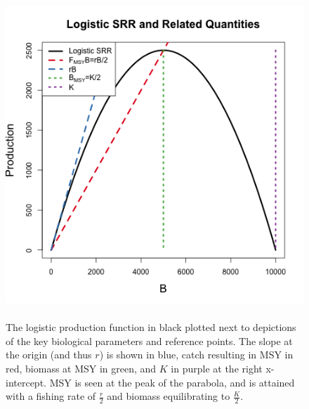 \begin{figure}[h!]
\begin{minipage}[h!]{0.6\textwidth}
        \includegraphics[width=\textwidth]{./plots/srrSchaeffer.png}
\end{minipage}
\begin{minipage}[h!]{0.37\textwidth}
\caption{\label{srrSchaefer}
	\\The logistic production function in black plotted next to depictions of the key biological parameters and reference points.
        The slope at the origin (and thus $r$) is shown in blue, catch resulting in MSY in red, biomass at MSY in green, and $K$ in purple at the right x-intercept.
        MSY is seen at the peak of the parabola, and is attained with a fishing rate of $\frac{r}{2}$ and biomass equilibrating to $\frac{K}{2}$.
}
\end{minipage}
\end{figure}

